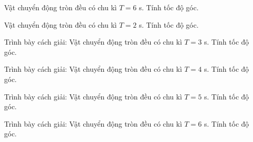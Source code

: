 \begin{ex}
Vật chuyển động tròn đều có chu kì $T=6$ s. Tính tốc độ góc.
\end{ex}

\begin{ex}
Vật chuyển động tròn đều có chu kì $T=2$ s. Tính tốc độ góc.
\end{ex}

\begin{ex}
Trình bày cách giải: Vật chuyển động tròn đều có chu kì $T=3$ s. Tính tốc độ góc.
\choiceTF

\end{ex}

\begin{ex}
Trình bày cách giải: Vật chuyển động tròn đều có chu kì $T=4$ s. Tính tốc độ góc.
\choiceTF

\end{ex}

\begin{ex}
Trình bày cách giải: Vật chuyển động tròn đều có chu kì $T=5$ s. Tính tốc độ góc.
\choiceTF

\end{ex}

\begin{ex}
Trình bày cách giải: Vật chuyển động tròn đều có chu kì $T=6$ s. Tính tốc độ góc.
\choiceTF

\end{ex}

